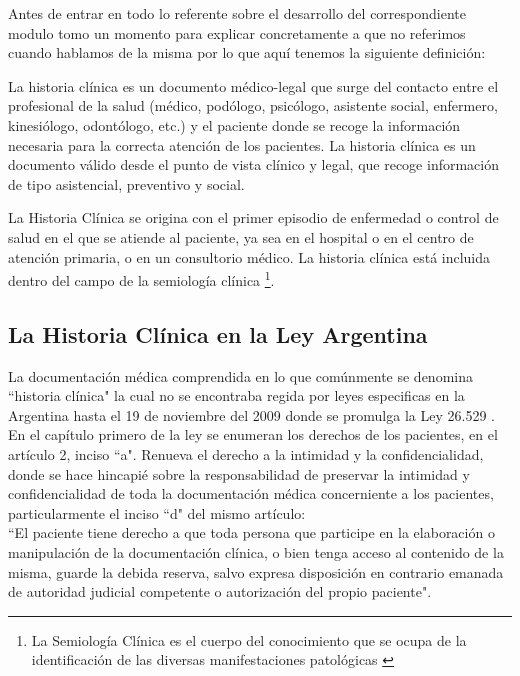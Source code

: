 Antes de entrar en todo lo referente sobre el desarrollo del correspondiente modulo tomo un momento para explicar concretamente a que no referimos cuando hablamos de la misma por lo que aquí tenemos la siguiente definición:

La historia clínica es un documento médico-legal que surge del contacto entre el profesional de la salud (médico, podólogo, psicólogo, asistente social, enfermero, kinesiólogo, odontólogo, etc.) y el paciente donde se recoge la información necesaria para la correcta atención de los pacientes. La historia clínica es un documento válido desde el punto de vista clínico y legal, que recoge información de tipo asistencial, preventivo y social.

La Historia Clínica se origina con el primer episodio de enfermedad o control de salud en el que se atiende al paciente, ya sea en el hospital o en el centro de atención primaria, o en un consultorio médico. La historia clínica está incluida dentro del campo de la semiología clínica \footnote{La Semiología Clínica es el cuerpo del conocimiento que se ocupa de la identificación de las diversas manifestaciones patológicas \cite{SemiClin}}.

\subsection{La Historia Clínica en la Ley Argentina}

La documentación médica comprendida en lo que comúnmente se denomina ``historia clínica" la cual no se encontraba regida por leyes especificas en la Argentina hasta el 19 de noviembre del 2009 donde se promulga la Ley 26.529 \cite{LeyHC}.\\[0.1cm]

En el capítulo primero de la ley se enumeran los derechos de los pacientes, en el artículo 2, inciso ``a". Renueva el derecho a la intimidad y la confidencialidad, donde se hace hincapié sobre la responsabilidad de preservar la intimidad y confidencialidad de toda la documentación médica concerniente a los pacientes, particularmente el inciso ``d" del mismo artículo:\\[0.1cm]

``El paciente tiene derecho a que toda persona que participe en la elaboración o manipulación de la documentación clínica, o bien tenga acceso al contenido de la misma, guarde la debida reserva, salvo expresa disposición en contrario emanada de autoridad judicial competente o autorización del propio paciente".\\[0.1cm]

